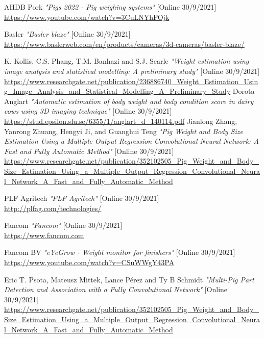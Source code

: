 ﻿\documentclass[10pt,a4paper,twocolumn,twoside]{article}
\begin{document}
\begin{thebibliography}{11}


    AHDB Pork \emph{"Pigs 2022 - Pig weighing systems"} [Online 30/9/2021] \\
    \url{https://www.youtube.com/watch?v=3CuLNYhFOjk}
    
    Basler \emph{"Basler blaze"} [Online 30/9/2021] \\
    \url{https://www.baslerweb.com/en/products/cameras/3d-cameras/basler-blaze/}

    K. Kollis, C.S. Phang, T.M. Banhazi and S.J. Searle \emph{"Weight estimation using image analysis and
    statistical modelling: A preliminary study"} [Online 30/9/2021] \\
    \url{https://www.researchgate.net/publication/236886740_Weight_Estimation_Using_Image_Analysis_and_Statistical_Modelling_A_Preliminary_Study}
    Dorota Anglart \emph{"Automatic estimation of body weight and body condition score in dairy cows using 3D imaging technique"} [Online 30/9/2021] \\
    \url{https://stud.epsilon.slu.se/6355/1/anglart_d_140114.pdf}
    Jianlong Zhang, Yanrong Zhuang, Hengyi Ji, and Guanghui Teng \emph{"Pig Weight and Body Size Estimation Using a Multiple Output Regression Convolutional Neural Network: A Fast and Fully Automatic Method"} [Online 30/9/2021] \\
    \url{https://www.researchgate.net/publication/352102505_Pig_Weight_and_Body_Size_Estimation_Using_a_Multiple_Output_Regression_Convolutional_Neural_Network_A_Fast_and_Fully_Automatic_Method}
    
    PLF Agritech \emph{"PLF Agritech"} [Online 30/9/2021] \\
    \url{http://plfag.com/technologies/}
    
    Fancom \emph{"Fancom"} [Online 30/9/2021] \\
    \url{https://www.fancom.com}

    Fancom BV \emph{"eYeGrow - Weight monitor for finishers"} [Online 30/9/2021] \\
    \url{https://www.youtube.com/watch?v=CSuWWgY43PA}    

    Eric T. Psota, Mateusz Mittek, Lance Pérez and Ty B Schmidt \emph{"Multi-Pig Part Detection and Association with a Fully Convolutional Network"} [Online 30/9/2021] \\
    \url{https://www.researchgate.net/publication/352102505_Pig_Weight_and_Body_Size_Estimation_Using_a_Multiple_Output_Regression_Convolutional_Neural_Network_A_Fast_and_Fully_Automatic_Method}
    

\end{thebibliography}
\end{document}
